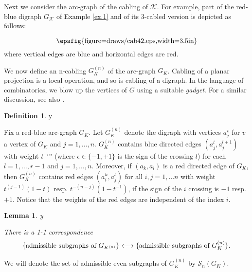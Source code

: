 \documentclass{amsart}
\theoremstyle{plain}
\newtheorem{lemma}[proposition]{Lemma}
\theoremstyle{definition}
\newtheorem{definition}[proposition]{Definition}
\theoremstyle{remark}
\def\printname#1{
        \if\draft y
                \smash{\makebox[0pt]{\hspace{-0.5in}
                        \raisebox{8pt}{\tt\tiny #1}}}
        \fi
}
\newcommand{\psdraw}[2]
         {\begin{array}{c} \hspace{-1.3mm}
        \raisebox{-4pt}{\epsfig{figure=draws/#1.eps,width=#2}}
        \hspace{-1.9mm}\end{array}}
\def\lbl#1{\label{#1}\printname{#1}}
\def\K{\mathcal K}
\def\e{\epsilon}
\def\Sev{{\mathcal S}}
\begin{document}
Next we consider the arc-graph of the cabling of $\K$.
For example, part of the red-blue digraph $G_{\K}$ of Example \ref{ex.1} and 
of its 3-cabled version is depicted as follows:
$$
\psdraw{cab42}{3.5in}
$$
where vertical edges are blue and horizontal edges are red.

We now define an n-cabling $G_K^{(n)}$ of the arc-graph $G_K$. 
Cabling of a planar projection is a local operation, and
so is cabling of a digraph. In the language of combinatorics, we blow up
the vertices of $G$ using a suitable {\em gadget}. For a similar discussion,
see also \cite[Section 4]{GL}.



\begin{definition}
\lbl{def.cabled2}
Fix a red-blue arc-graph $G_K$. Let $G_K^{(n)}$
denote the digraph with vertices $a^v_j$ for $v$ a vertex of $G_K$ 
and $j=1,\dots,n$.
$G_K^{(n)}$ contains blue directed edges $(a^l_j,a^{l+1}_j)$ with weight
$t^{-\e n}$ (where $\e \in \{-1,+1\}$ is the sign of the crossing $l$)
for each $l=1,\dots,r-1$ and $j=1,\dots,n$. Moreover,
if $(a_k,a_l)$ is a red directed edge of $G_K$, then $G_K^{(n)}$ contains
red edges $(a^k_i,a^l_j)$ for all $i,j=1,\dots n$ with weight
$t^{(j-1)}(1-t)$ resp. $t^{-(n-j)}(1-t^{-1})$, if the sign of the $i$ 
crossing is $-1$ resp. $+1$. Notice that the weights of the red edges are 
independent of the index $i$. 
\end{definition}



\begin{lemma}
\lbl{lem.evenn}
There is a 1-1 correspondence
$$
\{\text{\rm{admissible subgraphs of}} \,\,
G_{K^{(n)}}\} \longleftrightarrow 
\{\text{\rm{admissible subgraphs of}} \,\, G_K^{(n)} \}.
$$
\end{lemma}

We will denote the set of admissible even subgraphs of $G_K^{(n)}$ by 
$\Sev_n(G_K)$.
\end{document}
